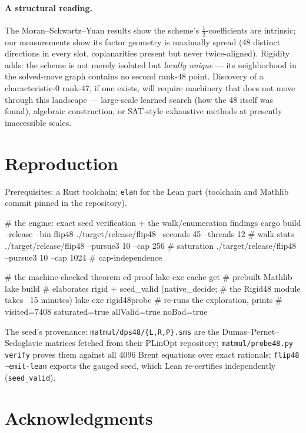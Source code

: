 \documentclass[10pt]{article}
\begin{document}
\paragraph{A structural reading.}
The Moran--Schwartz--Yuan results show the scheme's
$\tfrac12$-coefficients are intrinsic; our measurements show its
factor geometry is maximally spread (48 distinct directions in every
slot, coplanarities present but never twice-aligned). Rigidity adds:
the scheme is not merely isolated but \emph{locally unique} --- its
neighborhood in the solved-move graph contains no second rank-48
point. Discovery of a characteristic-0 rank-47, if one exists, will
require machinery that does not move through this landscape ---
large-scale learned search (how the 48 itself was found), algebraic
construction, or SAT-style exhaustive methods at presently
inaccessible scales.

\section{Reproduction}\label{sec:repro}

Prerequisites: a Rust toolchain; \texttt{elan} for the Lean part
(toolchain and Mathlib commit pinned in the repository).

\begin{Code}
# the engine: exact seed verification + the walk/enumeration findings
cargo build --release --bin flip48
./target/release/flip48 --seconds 45 --threads 12      # walk stats
./target/release/flip48 --pursue3 10 --cap 256         # saturation
./target/release/flip48 --pursue3 10 --cap 1024        # cap-independence

# the machine-checked theorem
cd proof
lake exe cache get     # prebuilt Mathlib
lake build             # elaborates rigid + seed_valid (native_decide;
                       # the Rigid48 module takes ~15 minutes)
lake exe rigid48probe  # re-runs the exploration, prints
                       # visited=7408 saturated=true allValid=true noBad=true
\end{Code}

The seed's provenance: \texttt{matmul/dps48/\{L,R,P\}.sms} are the
Dumas--Pernet--Sedoglavic matrices fetched from their PLinOpt
repository; \texttt{matmul/probe48.py verify} proves them against all
4096 Brent equations over exact rationals; \texttt{flip48
--emit-lean} exports the gauged seed, which Lean re-certifies
independently (\texttt{seed\_valid}).

\section*{Acknowledgments}
\end{document}
